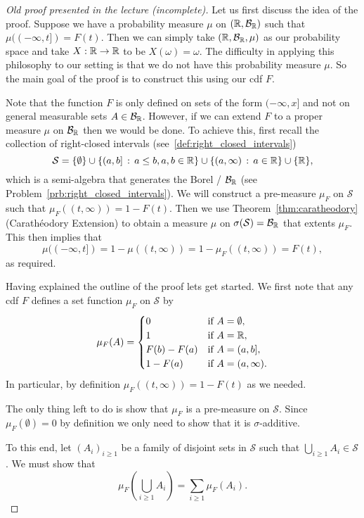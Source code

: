 \begin{proof}[Old proof presented in the lecture (incomplete)]

Let us first discuss the idea of the proof. Suppose we have a probability measure $\mu$ on $(\mathbb R, \mathcal B_{\mathbb R})$ such that $\mu((-\infty,t]) = F(t)$. Then we can simply take $(\mathbb R, \mathcal B_{\mathbb R}, \mu)$ as our probability space and take $X : \mathbb R \to \mathbb R$ to be $X(\omega) = \omega$. The difficulty in applying this philosophy to our setting is that we do not have this probability measure $\mu$. So the main goal of the proof is to construct this using our cdf $F$. 

Note that the function $F$ is only defined on sets of the form $(-\infty,x]$ and not on general measurable sets $A \in \mathcal B_{\mathbb R}$. However, if we can extend $F$ to a proper measure $\mu$ on $\mathcal B_{\mathbb R}$ then we would be done. To achieve this, first recall the collection of right-closed intervals (see~\eqref{def:right_closed_intervals})
\[
	\mathcal{S} = \{\emptyset\} \cup \{(a,b] \, : \, a \le b, a,b \in \mathbb R\} \cup \{(a, \infty) \, : \, a \in \mathbb R\} \cup \{\mathbb R\},
\] 
which is a semi-algebra that generates the Borel \sigalg/ $\mathcal B_{\mathbb R}$ (see Problem~\ref{prb:right_closed_intervals}). We will construct a pre-measure $\mu_F$ on $\mathcal{S}$ such that $\mu_F((t,\infty)) = 1 - F(t)$. Then we use Theorem~\ref{thm:caratheodory} (Carath\'{e}odory Extension) to obtain a measure $\mu$ on $\sigma(\mathcal{S}) = \mathcal B_{\mathbb R}$ that extents $\mu_F$. This then implies that 
\[
	\mu((-\infty,t]) = 1 - \mu((t,\infty)) = 1 - \mu_F((t,\infty)) = F(t),
\]
as required. 

Having explained the outline of the proof lets get started. We first note that any cdf $F$ defines a set function $\mu_F$ on $\mathcal{S}$ by
\[
	\mu_F(A) = \begin{cases}
		0 &\text{if } A = \emptyset,\\
		1 &\text{if } A = \mathbb R,\\
		F(b) - F(a) &\text{if } A = (a,b],\\
		1 - F(a) &\text{if } A = (a, \infty).
	\end{cases}
\]
In particular, by definition $\mu_F((t,\infty)) = 1 - F(t)$ as we needed.

The only thing left to do is show that $\mu_F$ is a pre-measure on $\mathcal{S}$. Since $\mu_F(\emptyset) = 0$ by definition we only need to show that it is $\sigma$-additive. 

To this end, let $(A_i)_{i \ge 1}$ be a family of disjoint sets in $\mathcal{S}$ such that $\bigcup_{i \ge 1} A_i \in \mathcal{S}$. We must show that
\begin{equation}\label{eq:construction_rv_sig_add}
	\mu_F(\bigcup_{i \ge 1} A_i) = \sum_{i \ge 1} \mu_F(A_i).
\end{equation}


\end{proof}
